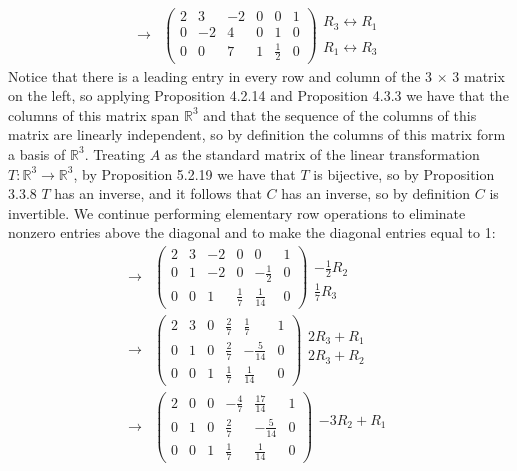\documentclass[12pt]{article}
\newenvironment{problem}[2][Problem]
{
	\begin{trivlist} 
		\item[\hskip \labelsep {\bfseries #1 #2:}]
	}
{
	\end{trivlist}
	}
\newenvironment{solution}[1][Solution]
{
	\begin{trivlist} 
		\item[\hskip \labelsep {\itshape #1:}]
	}
	{
	\end{trivlist}
}
\begin{document}
\begin{problem}{5}
\begin{solution}
\begin{align*}
%
\rightarrow & \begin{pmatrix} 2&3&-2&0&0&1\\0&-2&4&0&1&0\\0&0&7&1&\frac{1}{2}&0 \end{pmatrix} \begin{matrix} R_3 \leftrightarrow R_1 \text{} \\ \text{} \\ R_1 \leftrightarrow R_3 \text{} \end{matrix}
\end{align*}
Notice that there is a leading entry in every row and column of the 3 $\times$ 3 matrix on the left, so applying Proposition 4.2.14 and Proposition 4.3.3 we have that the columns of this matrix span $\mathbb{R}^3$ and that the sequence of the columns of this matrix are linearly independent, so by definition the columns of this matrix form a basis of $\mathbb{R}^3$. Treating $A$ as the standard matrix of the linear transformation $T:\mathbb{R}^3 \to \mathbb{R}^3$, by Proposition 5.2.19 we have that $T$ is bijective, so by Proposition 3.3.8 $T$ has an inverse, and it follows that $C$ has an inverse, so by definition $C$ is invertible. We continue performing elementary row operations to eliminate nonzero entries above the diagonal and to make the diagonal entries equal to 1:
\begin{align*}
\rightarrow & \begin{pmatrix} 2&3&-2&0&0&1\\0&1&-2&0&-\frac{1}{2}&0\\0&0&1&\frac{1}{7}&\frac{1}{14}&0 \end{pmatrix} \begin{matrix} \text{} \\ -\frac{1}{2}R_2 \text{} \\ \frac{1}{7}R_3 \text{} \end{matrix}\\
%
\rightarrow & \begin{pmatrix} 2&3&0&\frac{2}{7}&\frac{1}{7}&1\\0&1&0&\frac{2}{7}&-\frac{5}{14}&0\\0&0&1&\frac{1}{7}&\frac{1}{14}&0 \end{pmatrix} \begin{matrix} 2R_3+R_1\text{} \\ 2R_3+R_2 \text{} \\ \text{} \end{matrix}\\
%
\rightarrow & \begin{pmatrix} 2&0&0&-\frac{4}{7}&\frac{17}{14}&1\\0&1&0&\frac{2}{7}&-\frac{5}{14}&0\\0&0&1&\frac{1}{7}&\frac{1}{14}&0 \end{pmatrix} \begin{matrix} -3R_2+R_1\text{} \\ \text{} \\ \text{} \end{matrix}\\

\end{align*}
\end{solution}
\end{problem}
\end{document}

